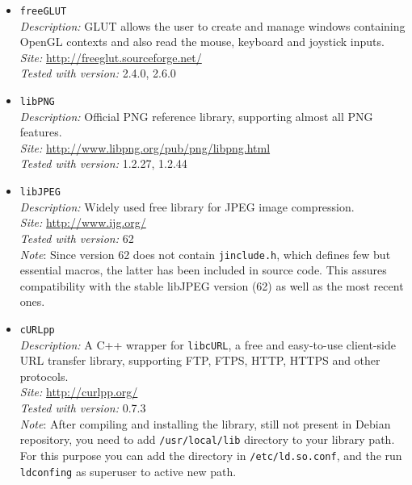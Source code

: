 \begin{itemize}

  \item \texttt{freeGLUT} \\
    \textit{Description:} \small {GLUT allows the user to create and manage
      windows containing OpenGL contexts and also read the mouse, keyboard
      and joystick inputs.} \\
    \textit{Site:} \url{http://freeglut.sourceforge.net/} \\
    \textit{Tested with version:} 2.4.0, 2.6.0

  \item \texttt{libPNG} \\
    \textit{Description:} \small {Official PNG reference library, supporting
      almost all PNG features.} \\
    \textit{Site:} \url{http://www.libpng.org/pub/png/libpng.html} \\
    \textit{Tested with version:} 1.2.27, 1.2.44

  \item \texttt{libJPEG} \\
    \textit{Description:} \small {Widely used free library for JPEG image
      compression.} \\
    \textit{Site:} \url{http://www.ijg.org/} \\
    \textit{Tested with version:} 62 \\
    \textit{Note}: \small{Since version 62 does not contain \texttt{jinclude.h},
      which defines few but essential macros, the latter has been included in
      \framework{} source code. This assures compatibility with the stable
      libJPEG version (62) as well as the most recent ones.}

  \item \texttt{cURLpp} \\
    \textit{Description:} \small {A C++ wrapper for \texttt{libcURL}, a free and
      easy-to-use client-side URL transfer library, supporting FTP, FTPS, HTTP, HTTPS
      and other protocols.} \\
    \textit{Site:} \url{http://curlpp.org/} \\
    \textit{Tested with version:} 0.7.3 \\
    \textit{Note}: \small{After compiling and installing the library, still not present
      in Debian repository, you need to add \texttt{/usr/local/lib} directory
      to your library path. For this purpose you can add the directory in
      \texttt{/etc/ld.so.conf}, and the run
      \texttt{ldconfing} as superuser to active new path.}

\end{itemize}

